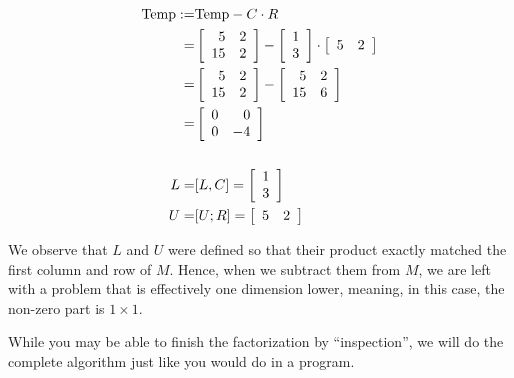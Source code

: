 \begin{align*}
    {\rm Temp}:=& {\rm Temp}-C \cdot R \\
    =& \left[\begin{array}{rr} 5 & 2\\
15 & 2 \end{array}\right] -  \left[\begin{array}{r} 1 \\ 3 \end{array} \right] \cdot  \left[\begin{array}{rr} 5 & 2 \end{array} \right] \\
=&  \left[\begin{array}{rr} 5 & 2\\
15 & 2 \end{array}\right] -   \left[\begin{array}{rr} 5 & 2\\
15 & 6 \end{array}\right] \\
=&   \left[\begin{array}{rr} 0 & 0\\
0 & -4\end{array}\right] \\
\\
L=&[L,C] = \left[\begin{array}{r} 1 \\ 3\end{array} \right]\\
U=&[U;R] = \left[\begin{array}{rr} 5 & 2 \end{array} \right]
\end{align*}

\begin{tcolorbox}[sharp corners, colback=green!30, colframe=green!80!blue, title=\textbf{\large Why LU Factorization Works: Peeling the Onion}]
We observe that $L$ and $U$ were defined so that their product exactly matched the first column and row of $M$. Hence, when we subtract them from $M$, we are left with a problem that is effectively one dimension lower, meaning, in this case, the non-zero part is $1 \times 1$. 
\end{tcolorbox}

While you may be able to finish the factorization by ``inspection'', we will do the complete algorithm just like you would do in a program.\\


